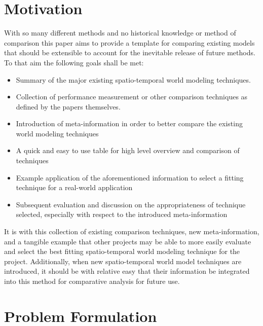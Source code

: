   \section{ Motivation }

  With so many different methods and no historical knowledge or method of comparison
  this paper aims to provide a template for comparing existing models that should
  be extensible to account for the inevitable release of future methods. To that
  aim the following goals shall be met:

  \begin{itemize}
    \item Summary of the major existing spatio-temporal world modeling techniques.

    \item Collection of performance measurement or other comparison techniques as
      defined by the papers themselves.

    \item Introduction of meta-information in order to better compare the existing
      world modeling techniques

    \item A quick and easy to use table for high level overview and comparison of techniques

    \item Example application of the aforementioned information to select a fitting
      technique for a real-world application

    \item Subsequent evaluation and discussion on the appropriateness of technique
      selected, especially with respect to the introduced meta-information

  \end{itemize}

  It is with this collection of existing comparison techniques, new meta-information,
  and a tangible example that other projects may be able to more easily evaluate
  and select the best fitting spatio-temporal world modeling technique for the
  project. Additionally, when new spatio-temporal world model techniques are
  introduced, it should be with relative easy that their information be integrated
  into this method for comparative analysis for future use.



  \section{ Problem Formulation }

